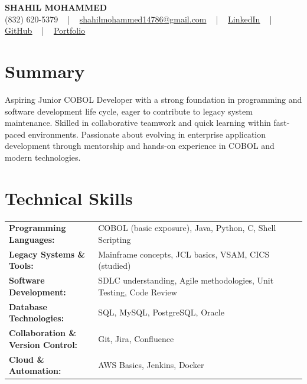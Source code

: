 \documentclass[letterpaper,11pt]{article}
\begin{document}
\begin{center}
    {\fontsize{14pt}{12pt}\selectfont \textbf{\MakeUppercase{Shahil Mohammed}}}\\ \vspace{2pt}
    \fontsize{10pt}{12pt}\selectfont (832) 620-5379 ~ | ~ \href{mailto:shahilmohammed14786@gmail.com}{shahilmohammed14786@gmail.com} ~ | ~  
    \href{https://www.linkedin.com/in/shahil-mohammed-9652931a1/}{\color{blue}\underline{LinkedIn}}  ~ | ~ 
    \href{https://github.com/freakbeast14}{\color{blue}\underline{GitHub}} ~ | ~ 
    \href{https://shahil-mohammed.netlify.app/}{\color{blue}\underline{Portfolio}}
    \vspace{-8pt}
\end{center}

\section{Summary}
\fontsize{9pt}{10pt}\selectfont
Aspiring Junior COBOL Developer with a strong foundation in programming and software development life cycle, eager to contribute to legacy system maintenance. Skilled in collaborative teamwork and quick learning within fast-paced environments. Passionate about evolving in enterprise application development through mentorship and hands-on experience in COBOL and modern technologies.
 \vspace{-5pt}
 
\section{Technical Skills}
        \vspace{-14pt}
        \begin{table}[h]
            \fontsize{9pt}{10pt}\selectfont
            \begin{tabular}{p{0.3\linewidth} p{0.7\linewidth}}
                \textbf{Programming Languages:} & COBOL (basic exposure), Java, Python, C, Shell Scripting \\
                \textbf{Legacy Systems \& Tools:} & Mainframe concepts, JCL basics, VSAM, CICS (studied) \\
                \textbf{Software Development:} & SDLC understanding, Agile methodologies, Unit Testing, Code Review \\
                \textbf{Database Technologies:} & SQL, MySQL, PostgreSQL, Oracle \\
                \textbf{Collaboration \& Version Control:} & Git, Jira, Confluence \\
                \textbf{Cloud \& Automation:} & AWS Basics, Jenkins, Docker \\
            \end{tabular}
        \end{table}
 \vspace{-15pt}
 
\end{document}
